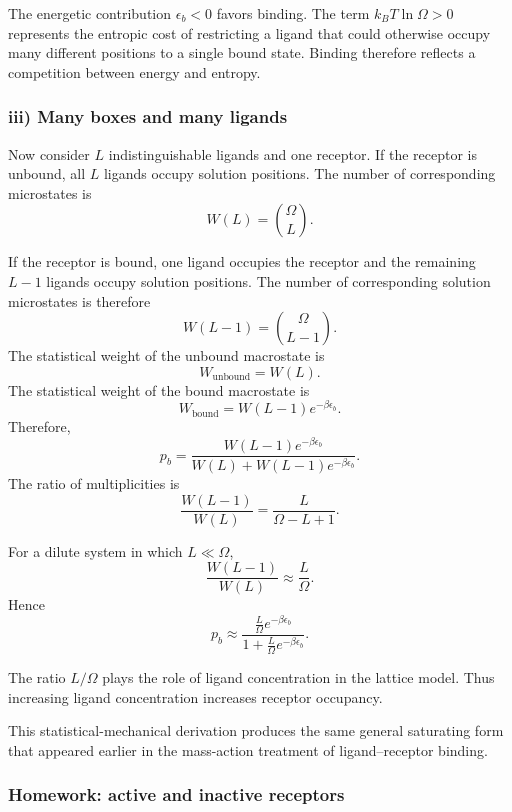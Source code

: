 The energetic contribution $\epsilon_b<0$ favors binding.
The term $k_BT\ln\Omega>0$ represents the entropic cost of restricting a ligand that could otherwise occupy many different positions to a single bound state.
Binding therefore reflects a competition between energy and entropy.


\subsubsection*{iii) Many boxes and many ligands}

Now consider $L$ indistinguishable ligands and one receptor.
If the receptor is unbound, all $L$ ligands occupy solution positions.
The number of corresponding microstates is
\[
    W(L)=\binom{\Omega}{L}.
\]

If the receptor is bound, one ligand occupies the receptor and the remaining $L-1$ ligands occupy solution positions.
The number of corresponding solution microstates is therefore
\[
    W(L-1)=\binom{\Omega}{L-1}.
\]
The statistical weight of the unbound macrostate is
\[
    W_{\mathrm{unbound}}=W(L).
\]
The statistical weight of the bound macrostate is
\[
    W_{\mathrm{bound}}=W(L-1)e^{-\beta \epsilon_b}.
\]
Therefore,
\[
    p_b=\frac{W(L-1)e^{-\beta \epsilon_b}}{W(L)+W(L-1)e^{-\beta \epsilon_b}}.
\]
The ratio of multiplicities is
\[
    \frac{W(L-1)}{W(L)}=\frac{L}{\Omega-L+1}.
\]

For a dilute system in which $L \ll \Omega$,
\[
    \frac{W(L-1)}{W(L)} \approx \frac{L}{\Omega}.
\]
Hence
\[
    p_b \approx \frac{\frac{L}{\Omega}e^{-\beta \epsilon_b}}{1+\frac{L}{\Omega}e^{-\beta \epsilon_b}}.
\]

The ratio $L/\Omega$ plays the role of ligand concentration in the lattice model.
Thus increasing ligand concentration increases receptor occupancy.

This statistical-mechanical derivation produces the same general saturating form that appeared earlier in the mass-action treatment of ligand--receptor binding.


\subsubsection*{Homework: active and inactive receptors}

